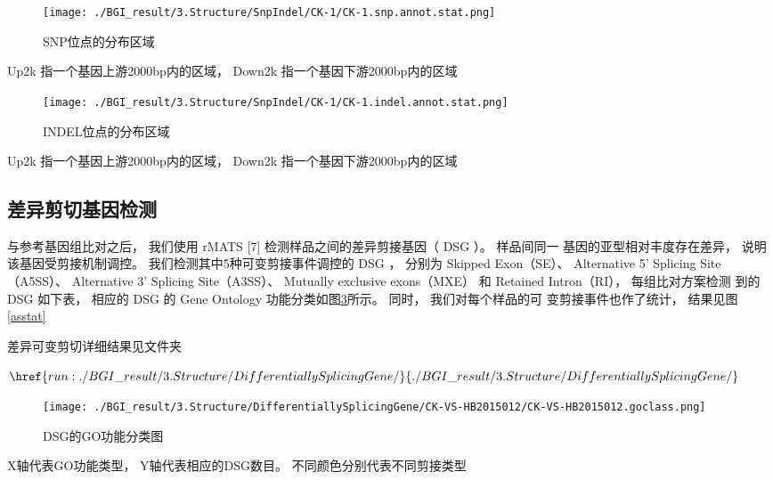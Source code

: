 \documentclass[10pt, oneside,a4paper]{article}
\begin{document}
\begin{figure}[H]
\centering
\texttt{[image: ./BGI\_result/3.Structure/SnpIndel/CK-1/CK-1.snp.annot.stat.png]}
\par
\renewcommand{\figurename}{图}
\caption{SNP位点的分布区域}
\label{snp}
\end{figure}
\begin{center}
Up2k 指一个基因上游2000bp内的区域， Down2k 指一个基因下游2000bp内的区域
\end{center}

\begin{figure}[H]
\centering
\texttt{[image: ./BGI\_result/3.Structure/SnpIndel/CK-1/CK-1.indel.annot.stat.png]}
\par
\renewcommand{\figurename}{图}
\caption{INDEL位点的分布区域}
\label{indel}
\end{figure}
\begin{center}
Up2k 指一个基因上游2000bp内的区域， Down2k 指一个基因下游2000bp内的区域
\end{center}


\subsection{差异剪切基因检测}
与参考基因组比对之后， 我们使用 rMATS [7] 检测样品之间的差异剪接基因（ DSG ）。 样品间同一
基因的亚型相对丰度存在差异， 说明该基因受剪接机制调控。 我们检测其中5种可变剪接事件调控的 DSG
， 分别为 Skipped Exon（SE）、 Alternative 5' Splicing Site（A5SS）、 Alternative 3' Splicing
Site（A3SS）、 Mutually exclusive exons（MXE） 和 Retained Intron（RI）， 每组比对方案检测
到的 DSG 如下表， 相应的 DSG 的 Gene Ontology 功能分类如图\ref{asp}所示。 同时， 我们对每个样品的可
变剪接事件也作了统计， 结果见图\ref{asstat}\par
差异可变剪切详细结果见文件夹\par
$\href{run:./BGI\_result/3.Structure/DifferentiallySplicingGene/}{./BGI\_result/3.Structure/DifferentiallySplicingGene/}$\par
\begin{figure}[H]
\centering
\texttt{[image: ./BGI\_result/3.Structure/DifferentiallySplicingGene/CK-VS-HB2015012/CK-VS-HB2015012.goclass.png]}
\par
\renewcommand{\figurename}{图}
\caption{DSG的GO功能分类图}
\label{asp}
\end{figure}
\begin{center}
X轴代表GO功能类型， Y轴代表相应的DSG数目。 不同颜色分别代表不同剪接类型
\end{center}
\end{document}
